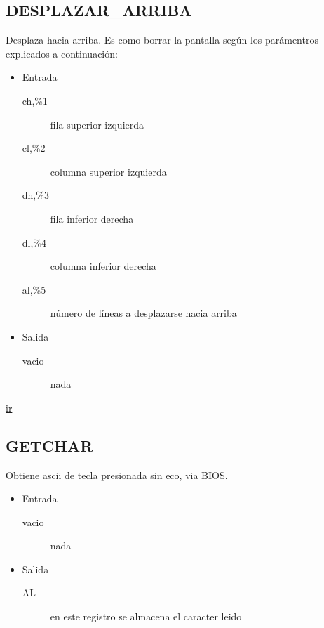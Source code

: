 \subsection{DESPLAZAR\_ARRIBA}
\label{sec-1-11}
Desplaza hacia arriba. Es como borrar la pantalla según los
parámentros explicados a  continuación:
\begin{itemize}
\item Entrada
\begin{description}
\item[ch,\%1] fila superior izquierda
\item[cl,\%2] columna superior izquierda
\item[dh,\%3] fila inferior derecha
\item[dl,\%4] columna inferior derecha
\item[al,\%5] número de líneas a desplazarse hacia arriba
\end{description}
\item Salida
\begin{description}
\item[vacio] nada
\end{description}
\end{itemize}

\href{http://www.ctyme.com/intr/rb-0096.htm}{ir}


\subsection{GETCHAR}
\label{sec-1-12}
Obtiene ascii de tecla presionada sin eco, via BIOS.
\begin{itemize}
\item Entrada
\begin{description}
\item[vacio] nada
\end{description}
\item Salida
\begin{description}
\item[AL] en este registro se almacena el caracter leido
\end{description}
\end{itemize}

